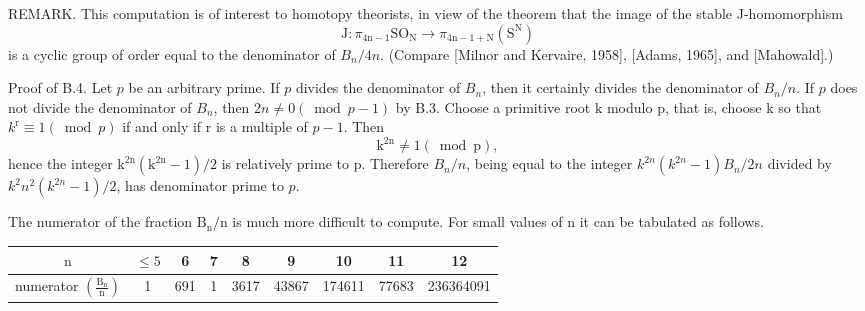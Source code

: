 \documentclass[10pt]{article}
\begin{document}
REMARK. This computation is of interest to homotopy theorists, in view of the theorem that the image of the stable J-homomorphism
$$
\mathrm{J}: \pi_{4 \mathrm{n}-1} \mathrm{SO}_{\mathrm{N}} \rightarrow \pi_{4 \mathrm{n}-1+\mathrm{N}}\left(\mathrm{S}^{\mathrm{N}}\right)
$$
is a cyclic group of order equal to the denominator of $B_{n} / 4 n$. (Compare [Milnor and Kervaire, 1958], [Adams, 1965], and [Mahowald].)

Proof of B.4. Let $p$ be an arbitrary prime. If $p$ divides the denominator of $B_{n}$, then it certainly divides the denominator of $B_{n} / n$. If $p$ does not divide the denominator of $B_{n}$, then $2 n \neq 0(\bmod p-1)$ by B.3. Choose a primitive root $\mathrm{k}$ modulo $\mathrm{p}$, that is, choose $\mathrm{k}$ so that $k^{\mathrm{r}} \equiv 1(\bmod p)$ if and only if $\mathrm{r}$ is a multiple of $p-1$. Then
$$
\mathrm{k}^{2 \mathrm{n}} \neq 1(\bmod \mathrm{p}),
$$
hence the integer $\mathrm{k}^{2 \mathrm{n}}\left(\mathrm{k}^{2 \mathrm{n}}-1\right) / 2$ is relatively prime to $\mathrm{p}$. Therefore $B_{n} / n$, being equal to the integer $k^{2 n}\left(k^{2 n}-1\right) B_{n} / 2 n$ divided by $k^{2} n^{2}\left(k^{2 n}-1\right) / 2$, has denominator prime to $p$.

The numerator of the fraction $\mathrm{B}_{\mathrm{n}} / \mathrm{n}$ is much more difficult to compute. For small values of $\mathrm{n}$ it can be tabulated as follows.

\begin{tabular}{|ccccccccc|}
\hline
$\mathrm{n}$ & $\leq 5$ & 6 & 7 & 8 & 9 & 10 & 11 & 12 \\
\hline
numerator $\left(\frac{\mathrm{B}_{\mathrm{n}}}{\mathrm{n}}\right)$ & 1 & 691 & 1 & 3617 & 43867 & 174611 & 77683 & 236364091 \\
\hline
\end{tabular}
\end{document}
